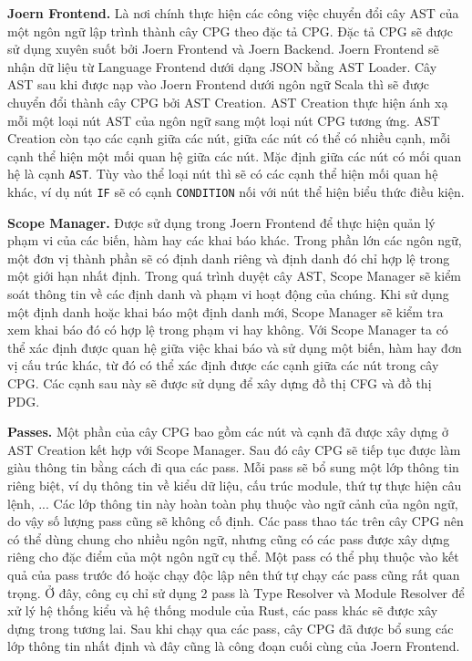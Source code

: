 \textbf{Joern Frontend.} Là nơi chính thực hiện các công việc chuyển đổi cây AST của một ngôn ngữ lập trình thành cây CPG theo đặc tả CPG.
Đặc tả CPG sẽ được sử dụng xuyên suốt bởi Joern Frontend và Joern Backend.
Joern Frontend sẽ nhận dữ liệu từ Language Frontend dưới dạng JSON bằng AST Loader.
Cây AST sau khi được nạp vào Joern Frontend dưới ngôn ngữ Scala thì sẽ được chuyển đổi thành cây CPG bởi AST Creation.
AST Creation thực hiện ánh xạ mỗi một loại nút AST của ngôn ngữ sang một loại nút CPG tương ứng.
AST Creation còn tạo các cạnh giữa các nút, giữa các nút có thể có nhiều cạnh, mỗi cạnh thể hiện một mối quan hệ giữa các nút.
Mặc định giữa các nút có mối quan hệ là cạnh \texttt{AST}.
Tùy vào thể loại nút thì sẽ có các cạnh thể hiện mối quan hệ khác, ví dụ nút \texttt{IF} sẽ có cạnh \texttt{CONDITION} nối với nút thể hiện biểu thức điều kiện.

\textbf{Scope Manager.} Được sử dụng trong Joern Frontend để thực hiện quản lý phạm vi của các biến, hàm hay các khai báo khác.
Trong phần lớn các ngôn ngữ, một đơn vị thành phần sẽ có định danh riêng và định danh đó chỉ hợp lệ trong một giới hạn nhất định.
Trong quá trình duyệt cây AST, Scope Manager sẽ kiểm soát thông tin về các định danh và phạm vi hoạt động của chúng.
Khi sử dụng một định danh hoặc khai báo một định danh mới, Scope Manager sẽ kiểm tra xem khai báo đó có hợp lệ trong phạm vi hay không.
Với Scope Manager ta có thể xác định được quan hệ giữa việc khai báo và sử dụng một biến, hàm hay đơn vị cấu trúc khác, từ đó có thể xác định được các cạnh giữa các nút trong cây CPG.
Các cạnh sau này sẽ được sử dụng để xây dựng đồ thị CFG và đồ thị PDG.

\textbf{Passes.} Một phần của cây CPG bao gồm các nút và cạnh đã được xây dựng ở AST Creation kết hợp với Scope Manager.
Sau đó cây CPG sẽ tiếp tục được làm giàu thông tin bằng cách đi qua các pass.
Mỗi pass sẽ bổ sung một lớp thông tin riêng biệt, ví dụ thông tin về kiểu dữ liệu, cấu trúc module, thứ tự thực hiện câu lệnh, ...
Các lớp thông tin này hoàn toàn phụ thuộc vào ngữ cảnh của ngôn ngữ, do vậy số lượng pass cũng sẽ không cố định.
Các pass thao tác trên cây CPG nên có thể dùng chung cho nhiều ngôn ngữ, nhưng cũng có các pass được xây dựng riêng cho đặc điểm của một ngôn ngữ cụ thể.
Một pass có thể phụ thuộc vào kết quả của pass trước đó hoặc chạy độc lập nên thứ tự chạy các pass cũng rất quan trọng.
Ở đây, công cụ chỉ sử dụng 2 pass là Type Resolver và Module Resolver để xử lý hệ thống kiểu và hệ thống module của Rust, các pass khác sẽ được xây dựng trong tương lai.
Sau khi chạy qua các pass, cây CPG đã được bổ sung các lớp thông tin nhất định và đây cũng là công đoạn cuối cùng của Joern Frontend.

